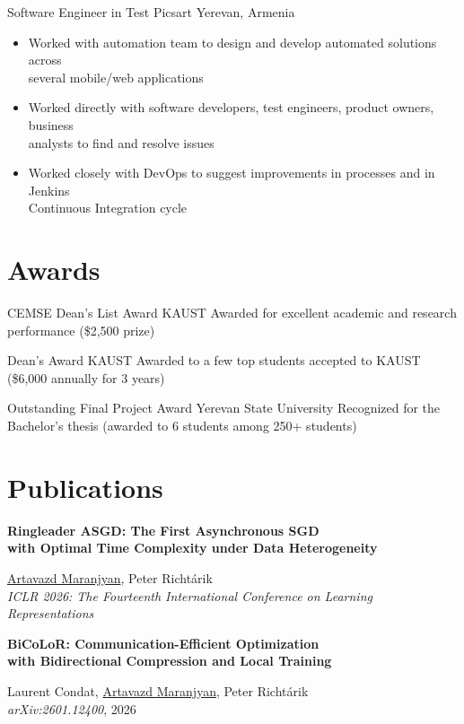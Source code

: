 \documentclass[10pt,a4paper,sans]{moderncv}        %
\newcommand{\kaust}{KAUST}
\newcommand{\picsart}{Picsart}
\newcommand{\yerevan}{Yerevan, Armenia}
\newcommand{\ysu}{Yerevan State University}
\begin{document}
{Software Engineer in Test}
{\picsart}
{\yerevan}
{}
{
  \begin{itemize}
  \item Worked with automation team to design and develop automated
  solutions across\\ several mobile/web applications
  \item Worked directly with software developers, test engineers,
  product owners, business\\ analysts to find and resolve issues
  \item Worked closely with DevOps to suggest improvements in processes and in Jenkins\\ Continuous Integration cycle
  \end{itemize}
} %


\section{Awards}

{CEMSE Dean's List Award}
{\kaust}
{}{}
{
  Awarded for excellent academic and research performance (\$2,500 prize)
}

{Dean's Award}
{\kaust}
{}{}
{
  Awarded to a few top students accepted to KAUST (\$6,000 annually for 3 years)
}

{Outstanding Final Project Award}
{\ysu}
{}{}
{
  Recognized for the Bachelor's thesis (awarded to 6 students among 250+ students)
}

\section{Publications}

{\parbox[t]{\linewidth}{\textbf{%
  Ringleader ASGD: The First Asynchronous SGD\\ with Optimal Time Complexity under Data Heterogeneity
  }}}
{}{}{}
{
  \normalsize \underline{Artavazd Maranjyan}, Peter Richtárik \\
  \textit{ICLR 2026: The Fourteenth International Conference on Learning Representations}
}

{\parbox[t]{\linewidth}{\textbf{%
  BiCoLoR: Communication-Efficient Optimization \\ with Bidirectional Compression and Local Training
  }}}
{}{}{}
{
  \normalsize Laurent Condat, \underline{Artavazd Maranjyan}, Peter Richtárik \\
  \textit{arXiv:2601.12400}, 2026
}
\end{document}
